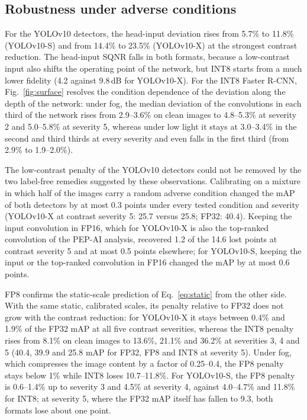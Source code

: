 \documentclass[pdflatex,sn-mathphys-num]{sn-jnl}%
\theoremstyle{thmstyleone}%
\theoremstyle{thmstyletwo}%
\theoremstyle{thmstylethree}%
\begin{document}
\begin{appendices}
\subsection{Robustness under adverse conditions}\label{sec:supp-res-rob}
For the YOLOv10 detectors, the head-input deviation rises from 5.7\% to 11.8\% (YOLOv10-S) and from 14.4\% to 23.5\% (YOLOv10-X) at the strongest contrast reduction. The head-input SQNR falls in both formats, because a low-contrast input also shifts the operating point of the network, but INT8 starts from a much lower fidelity (4.2 against 9.8\,dB for YOLOv10-X). For the INT8 Faster R-CNN, Fig.~\ref{fig:surface} resolves the condition dependence of the deviation along the depth of the network: under fog, the median deviation of the convolutions in each third of the network rises from 2.9--3.6\% on clean images to 4.8--5.3\% at severity 2 and 5.0--5.8\% at severity 5, whereas under low light it stays at 3.0--3.4\% in the second and third thirds at every severity and even falls in the first third (from 2.9\% to 1.9--2.0\%).

The low-contrast penalty of the YOLOv10 detectors could not be removed by the two label-free remedies suggested by these observations. Calibrating on a mixture in which half of the images carry a random adverse condition changed the mAP of both detectors by at most 0.3 points under every tested condition and severity (YOLOv10-X at contrast severity 5: 25.7 versus 25.8; FP32: 40.4). Keeping the input convolution in FP16, which for YOLOv10-X is also the top-ranked convolution of the PEP-AI analysis, recovered 1.2 of the 14.6 lost points at contrast severity 5 and at most 0.5 points elsewhere; for YOLOv10-S, keeping the input or the top-ranked convolution in FP16 changed the mAP by at most 0.6 points.

FP8 confirms the static-scale prediction of Eq.~\eqref{eq:static} from the other side. With the same static, calibrated scales, its penalty relative to FP32 does not grow with the contrast reduction: for YOLOv10-X it stays between 0.4\% and 1.9\% of the FP32 mAP at all five contrast severities, whereas the INT8 penalty rises from 8.1\% on clean images to 13.6\%, 21.1\% and 36.2\% at severities 3, 4 and 5 (40.4, 39.9 and 25.8 mAP for FP32, FP8 and INT8 at severity 5). Under fog, which compresses the image content by a factor of 0.25--0.4, the FP8 penalty stays below 1\% while INT8 loses 10.7--11.8\%. For YOLOv10-S, the FP8 penalty is 0.6--1.4\% up to severity 3 and 4.5\% at severity 4, against 4.0--4.7\% and 11.8\% for INT8; at severity 5, where the FP32 mAP itself has fallen to 9.3, both formats lose about one point.


\end{appendices}
\end{document}

